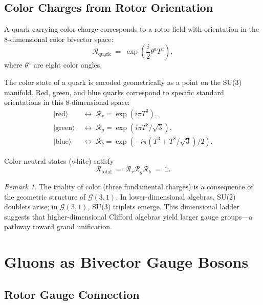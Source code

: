 \documentclass[11pt,a4paper]{article}
\newcommand{\Rotor}{\mathcal{R}}
\newcommand{\Cl}{\mathcal{G}}
\theoremstyle{definition}
\theoremstyle{plain}
\theoremstyle{remark}
\newtheorem{remark}{Remark}[section]
\begin{document}
\subsection{Color Charges from Rotor Orientation}

A quark carrying color charge corresponds to a rotor field with orientation in the 8-dimensional color bivector space:
\begin{equation}
\Rotor_{\mathrm{quark}} \;=\; \exp\left(\frac{i}{2}\theta^a T^a\right),
\label{eq:quark-rotor}
\end{equation}
where $\theta^a$ are eight color angles.

The color state of a quark is encoded geometrically as a point on the SU(3) manifold. Red, green, and blue quarks correspond to specific standard orientations in this 8-dimensional space:
\begin{align}
|\mathrm{red}\rangle &\;\leftrightarrow\; \Rotor_r = \exp(i\pi T^3), \\
|\mathrm{green}\rangle &\;\leftrightarrow\; \Rotor_g = \exp(i\pi T^8/\sqrt{3}), \\
|\mathrm{blue}\rangle &\;\leftrightarrow\; \Rotor_b = \exp(-i\pi(T^3 + T^8/\sqrt{3})/2).
\end{align}

Color-neutral states (white) satisfy
\begin{equation}
\Rotor_{\mathrm{total}} \;=\; \Rotor_r \Rotor_g \Rotor_b \;=\; \mathbb{1}.
\end{equation}

\begin{remark}
The triality of color (three fundamental charges) is a consequence of the geometric structure of $\Cl(3,1)$. In lower-dimensional algebras, SU(2) doublets arise; in $\Cl(3,1)$, SU(3) triplets emerge. This dimensional ladder suggests that higher-dimensional Clifford algebras yield larger gauge groups---a pathway toward grand unification.
\end{remark}

\vspace{1em}

\section{Gluons as Bivector Gauge Bosons}
\label{sec:gluons}

\subsection{Rotor Gauge Connection}
\end{document}
